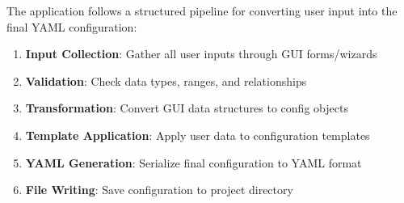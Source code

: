 \documentclass[11pt,a4paper]{article}
\begin{document}
The application follows a structured pipeline for converting user input into the final YAML configuration:

\begin{enumerate}
    \item \textbf{Input Collection}: Gather all user inputs through GUI forms/wizards
    \item \textbf{Validation}: Check data types, ranges, and relationships
    \item \textbf{Transformation}: Convert GUI data structures to config objects
    \item \textbf{Template Application}: Apply user data to configuration templates
    \item \textbf{YAML Generation}: Serialize final configuration to YAML format
    \item \textbf{File Writing}: Save configuration to project directory
\end{enumerate}
\end{document}
